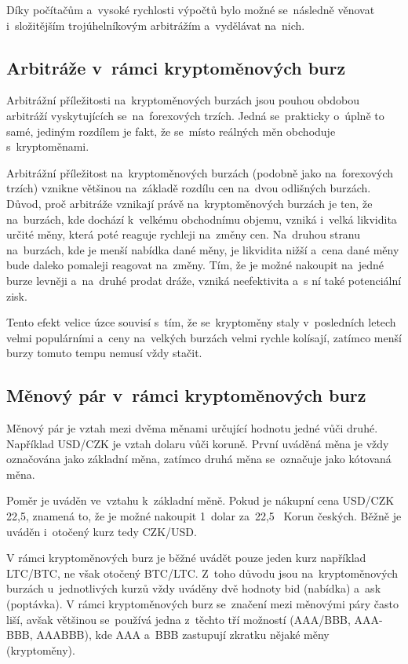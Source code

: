\documentclass[thesis=B,czech]{FITthesis}[2019/03/21]
\begin{document}
Díky počítačům a~vysoké rychlosti výpočtů bylo možné se~následně věnovat i~složitějším trojúhelníkovým arbitrážím a~vydělávat na~nich. \cite{investopedia_forex_arbitrage}

\subsection{Arbitráže v~rámci kryptoměnových burz}
Arbitrážní příležitosti na~kryptoměnových burzách jsou pouhou obdobou arbitráží vyskytujících se~na~forexových trzích. Jedná se~prakticky o~úplně to samé, jediným rozdílem je fakt, že se~místo reálných měn obchoduje s~kryptoměnami. 

Arbitrážní příležitost na~kryptoměnových burzách (podobně jako na~forexových trzích) vznikne většinou na~základě rozdílu cen na~dvou odlišných burzách. Důvod, proč arbitráže vznikají právě na~kryptoměnových burzách je ten, že na~burzách, kde dochází k~velkému obchodnímu objemu, vzniká i~velká likvidita určité měny, která poté reaguje rychleji na~změny cen. Na~druhou stranu na~burzách, kde je menší nabídka dané měny, je likvidita nižší a~cena dané měny bude daleko pomaleji reagovat na~změny. Tím, že je možné nakoupit na~jedné burze levněji a~na~druhé prodat dráže, vzniká neefektivita a~s ní také potenciální zisk.

Tento efekt velice úzce souvisí s~tím, že se~kryptoměny staly v~posledních letech velmi populárními a~ceny na~velkých burzách velmi rychle kolísají, zatímco menší burzy tomuto tempu nemusí vždy stačit. \cite{finder}

\subsection{Měnový pár v~rámci kryptoměnových burz}
Měnový pár je vztah mezi dvěma měnami určující hodnotu jedné vůči druhé. Například USD/CZK je vztah dolaru vůči koruně. První uváděná měna je vždy označována jako základní měna, zatímco druhá měna se~označuje jako kótovaná měna. \cite{Capital_menovy_par} 

Poměr je uváděn ve~vztahu k~základní měně. Pokud je nákupní cena USD/CZK 22,5, znamená to, že je možné nakoupit 1~dolar za~22,5~ Korun českých. Běžně je uváděn i~otočený kurz tedy CZK/USD. \cite{Capital_menovy_par} 

V rámci kryptoměnových burz je běžné uvádět pouze jeden kurz například LTC/BTC, ne však otočený BTC/LTC. Z~toho důvodu jsou \linebreak na~kryptoměnových burzách u~jednotlivých kurzů vždy uváděny dvě hodnoty bid (nabídka) a~ask (poptávka). 
V rámci kryptoměnových burz se~značení mezi měnovými páry často liší, avšak většinou se~používá jedna z~těchto tří možností (AAA/BBB, AAA-BBB, AAABBB), kde AAA a~BBB zastupují zkratku nějaké měny (kryptoměny).
\end{document}
